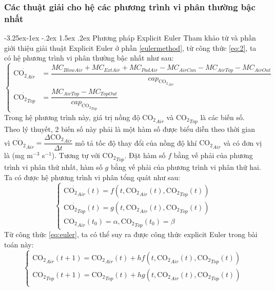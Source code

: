 \documentclass[a4paper]{article}
\makeatletter
\newcounter {subsubsubsection}[subsubsection]
\newcommand\subsubsubsection{\@startsection{subsubsubsection}{4}{\z@}%
                                     {-3.25ex\@plus -1ex \@minus -.2ex}%
                                     {1.5ex \@plus .2ex}%
                                     {\normalfont\normalsize\bfseries}}
\makeatother
\begin{document}
\subsubsection{Các thuật giải cho hệ các phương trình vi phân thường bậc nhất}\label{themethods}
\subsubsubsection{Phương pháp Explicit Euler}
Tham khảo từ \cite{EG96} và phần giới thiệu giải thuật Explicit Euler ở phần \ref{eulermethod}, từ công thức \eqref{eq:2}, ta có hệ phương trình vi phân thường bậc nhất như sau:
\begin{equation}
\begin{cases}
    \dot{\mathrm{CO_{2}}_{Air}} &= \dfrac{MC_{BlowAir} + MC_{ExtAir} + MC_{PadAir} - MC_{AirCan} - MC_{AirTop} - MC_{AirOut} }{cap_{\mathrm{CO_{2}}_{Air}}} \\
    
    \dot{\mathrm{CO_{2}}_{Top}} &= \dfrac{MC_{AirTop} - MC_{TopOut}}{cap_{\mathrm{CO_{2}}_{Top}}} 
\end{cases}
\end{equation}
Trong hệ phương trình này, giá trị nồng độ $\mathrm{CO_{2}}_{Air}$ và $\mathrm{CO_{2}}_{Top}$ là các biến số. Theo lý thuyết, 2 biến số này phải là một hàm số được biểu diễn theo thời gian vì $\dot{\mathrm{CO_{2}}}_{Air} = \dfrac{\Delta\mathrm{CO_{2}}_{Air}}{ \Delta t}$ mô tả tốc độ thay đổi của nồng độ khí $\mathrm{CO_{2}}_{Air}$ và có đơn vị là (mg m$^{-3}$ s$^{-1}$). Tương tự với $\mathrm{CO_{2}}_{Top}$. Đặt hàm số $f$ bằng vế phải của phương trình vi phân thứ nhất, hàm số $g$ bằng vế phải của phương trình vi phân thứ hai. Ta có được hệ phương trình vi phân tổng quát như sau:
\begin{equation}\label{eq:100}
\begin{cases}
    \dot{\mathrm{CO_{2}}_{Air}}(t) = f(t, \mathrm{CO_{2}}_{Air}(t), \mathrm{CO_{2}}_{Top}(t)) \\
    \dot{\mathrm{CO_{2}}_{Top}}(t) = g(t, \mathrm{CO_{2}}_{Air}(t), \mathrm{CO_{2}}_{Top}(t)) \\
    \mathrm{CO_{2}}_{Air}(t_0) = \alpha, \mathrm{CO_{2}}_{Top}(t_0) = \beta
\end{cases}
\end{equation}
Từ công thức \eqref{eq:euler}, ta có thể suy ra được công thức explicit Euler trong bài toán này: \\
\begin{equation}\label{eq:101}
\begin{cases}
    \mathrm{CO_{2}}_{Air}(t+1) = \mathrm{CO_{2}}_{Air}(t) + hf(t, \mathrm{CO_{2}}_{Air}(t), \mathrm{CO_{2}}_{Top}(t)) \\
    \mathrm{CO_{2}}_{Top}(t+1) = \mathrm{CO_{2}}_{Top}(t) + hg(t, \mathrm{CO_{2}}_{Air}(t), \mathrm{CO_{2}}_{Top}(t)) \\
\end{cases}
\end{equation}
\end{document}
